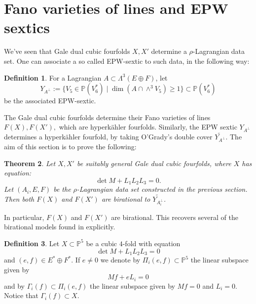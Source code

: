 \documentclass[11pt]{amsart}
\theoremstyle{plain}
\newtheorem{theorem}{Theorem}[section]
\numberwithin{equation}{section}
\theoremstyle{definition}
\newtheorem{definition}[theorem]{Definition}
\theoremstyle{remark}
\renewcommand{\P}{\mathbb P}
\newcommand{\bP}{\mathbb{P}}
\begin{document}
\section{Fano varieties of lines and EPW sextics}\label{sFanoLines}
We've seen that Gale dual cubic fourfolds $X, X'$ determine a $\rho$-Lagrangian data set. One can associate a so called EPW-sextic to such data, in the following way:

\begin{definition}\label{dEPW}
For a Lagrangian $A\subset \Lambda^3 (E\oplus F)$, let
$$Y_{A^\perp}:=\{V_5\in \bP(V_6^*) \mid \dim(A\cap \wedge^3 V_5)\geq 1\}\subset \bP(V_6^*)$$ 
be the associated EPW-sextic. 
\end{definition}
The Gale dual cubic fourfolds determine their Fano varieties of lines $F(X), F(X'),$ which are hyperk\"ahler fourfolds. Similarly, the EPW sextic $Y_{A^\perp}$ determines a hyperk\"ahler fourfold, by taking O'Grady's double cover $\widetilde{Y_{A^\perp}}$. The aim of this section is to prove the following:
\begin{theorem}
    Let $X, X'$ be suitably general Gale dual cubic fourfolds, where $X$ has equation:
    $$\det M+L_1L_2L_3=0.$$ Let $(A_i,E,F)$ be the $\rho$-Lagrangian data set constructed in the previous section.
    Then both $F(X)$ and $F(X')$ are birational to $\widetilde{Y_{A_i^\perp}}$. 
\end{theorem}

In particular, $F(X)$ and $F(X')$ are birational. This recovers several of the birational models found in \cite[Theorem 1.2]{BFMQ24} explicitly.


\begin{definition}\label{dP2}
Let $X \subset \P^5$ be a cubic $4$-fold with equation
\[
	\det M + L_1L_2L_3 =0
\]
and $(e,f) \in E^* \oplus F^*$. If $e \not=0$ 
we denote by  $\Pi_i(e,f) \subset \P^5$ the linear subspace given by $$Mf+e L_i = 0$$
and by  $\Gamma_i (f) \subset \Pi_i(e,f)$ the linear subspace  given by $Mf = 0$ and $L_i=0$. Notice that $\Gamma_i(f) \subset X$.
\end{definition}
\end{document}
